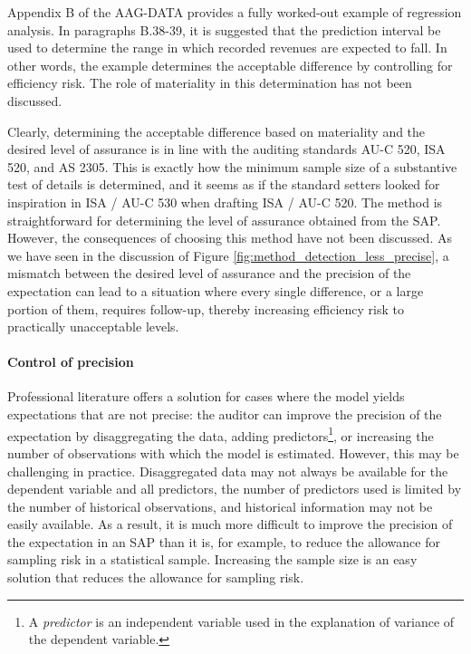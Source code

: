 \documentclass[12pt,a4paper]{memoir}
\begin{document}
Appendix B of the AAG-DATA provides a fully worked-out example of regression analysis. In paragraphs B.38-39, it is suggested that the prediction interval be used to determine the range in which recorded revenues are expected to fall. In other words, the example determines the acceptable difference by controlling for efficiency risk. The role of materiality in this determination has not been discussed.

Clearly, determining the acceptable difference based on materiality and the desired level of assurance is in line with the auditing standards AU-C 520, ISA 520, and AS 2305. This is exactly how the minimum sample size of a substantive test of details is determined, and it seems as if the standard setters looked for inspiration in ISA / AU-C 530 when drafting ISA / AU-C 520. The method is straightforward for determining the level of assurance obtained from the SAP. However, the consequences of choosing this method have not been discussed. As we have seen in the discussion of Figure \ref{fig:method_detection_less_precise}, a mismatch between the desired level of assurance and the precision of the expectation can lead to a situation where every single difference, or a large portion of them, requires follow-up, thereby increasing efficiency risk to practically unacceptable levels.

\paragraph{Control of precision} Professional literature offers a solution for cases where the model yields expectations that are not precise: the auditor can improve the precision of the expectation by disaggregating the data, adding predictors\footnote{A \textit{predictor} is an independent variable used in the explanation of variance of the dependent variable.}, or increasing the number of observations with which the model is estimated. However, this may be challenging in practice. Disaggregated data may not always be available for the dependent variable and all predictors, the number of predictors used is limited by the number of historical observations, and historical information may not be easily available. As a result, it is much more difficult to improve the precision of the expectation in an SAP than it is, for example, to reduce the allowance for sampling risk in a statistical sample. Increasing the sample size is an easy solution that reduces the allowance for sampling risk.
\end{document}
